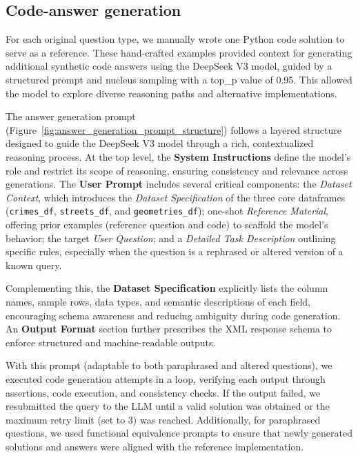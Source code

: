 \subsection{Code-answer generation}

For each original question type, we manually wrote one Python code solution to serve as a reference. These hand-crafted examples provided context for generating additional synthetic code answers using the DeepSeek V3 model, guided by a structured prompt and nucleus sampling \citep{Holtzman2020NucleusSampling, Ahmad2025OCRNVidia, Nvidia2024KaggleMath} with a top\_p value of 0.95. This allowed the model to explore diverse reasoning paths and alternative implementations.

The answer generation prompt (Figure~\ref{fig:answer_generation_prompt_structure}) follows a layered structure designed to guide the DeepSeek V3 model through a rich, contextualized reasoning process. At the top level, the \textbf{System Instructions} define the model’s role and restrict its scope of reasoning, ensuring consistency and relevance across generations. The \textbf{User Prompt} includes several critical components: the \textit{Dataset Context}, which introduces the \textit{Dataset Specification} of the three core dataframes (\texttt{crimes\_df}, \texttt{streets\_df}, and \texttt{geometries\_df}); one-shot \textit{Reference Material}, offering prior examples (reference question and code) to scaffold the model’s behavior; the target \textit{User Question}; and a \textit{Detailed Task Description} outlining specific rules, especially when the question is a rephrased or altered version of a known query.

Complementing this, the \textbf{Dataset Specification} explicitly lists the column names, sample rows, data types, and semantic descriptions of each field, encouraging schema awareness and reducing ambiguity during code generation. An \textbf{Output Format} section further prescribes the XML response schema to enforce structured and machine-readable outputs.

With this prompt (adaptable to both paraphrased and altered questions), we executed code generation attempts in a loop, verifying each output through assertions, code execution, and consistency checks. If the output failed, we resubmitted the query to the LLM until a valid solution was obtained or the maximum retry limit (set to 3) was reached. Additionally, for paraphrased questions, we used functional equivalence prompts to ensure that newly generated solutions and answers were aligned with the reference implementation.

